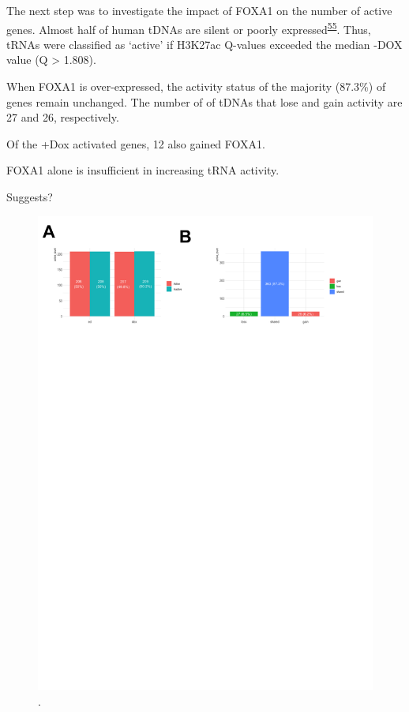 \documentclass[
  11pt,
]{article}
\begin{document}
The next step was to investigate the impact of FOXA1 on the number of active genes.
Almost half of human tDNAs are silent or poorly expressed\textsuperscript{\protect\hyperlink{ref-Torres2019}{55}}.
Thus, tRNAs were classified as `active' if H3K27ac Q-values exceeded the median -DOX value (Q \textgreater{} 1.808).

When FOXA1 is over-expressed, the activity status of the majority (87.3\%) of genes remain unchanged.
The number of of tDNAs that lose and gain activity are 27 and 26, respectively.

Of the +Dox activated genes, 12 also gained FOXA1.

FOXA1 alone is insufficient in increasing tRNA activity.

Suggests?

\begin{figure}[p]

{\centering \includegraphics[width=1\linewidth]{../images/results-03} 

}

\caption{.}\label{fig:results-3}
\end{figure}
\end{document}
